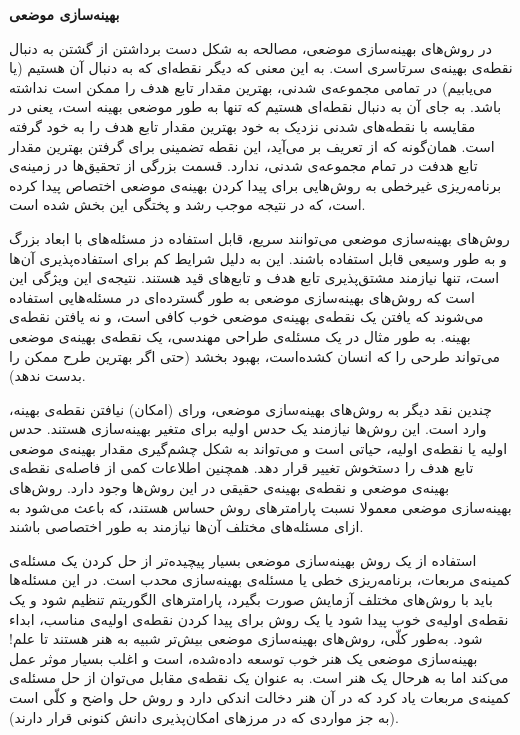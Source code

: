 \textbf{
بهینه‌سازی موضعی
}

در روش‌های بهینه‌سازی موضعی، مصالحه به شکل دست برداشتن از گشتن به دنبال نقطه‌ی بهینه‌ی سرتاسری است. به این معنی که دیگر نقطه‌ای که به دنبال آن هستیم (یا می‌یابیم) در تمامی مجموعه‌ی شدنی، بهترین مقدار تابع هدف را ممکن است نداشته باشد. به جای آن به دنبال نقطه‌ای هستیم که تنها به طور موضعی بهینه است، یعنی در مقایسه با نقطه‌های شدنی نزدیک به خود بهترین مقدار تابع هدف را به خود گرفته است. همان‌گونه که از تعریف بر می‌آید، این نقطه تضمینی برای گرفتن بهترین مقدار تابع هدفت در تمام مجموعه‌ی شدنی، ندارد. قسمت بزرگی از تحقیق‌ها در زمینه‌ی برنامه‌ریزی غیرخطی به روش‌هایی برای پیدا کردن بهینه‌ی موضعی اختصاص پیدا کرده است، که در نتیجه موجب رشد و پختگی این بخش شده است.


روش‌های بهینه‌سازی موضعی می‌توانند سریع، قابل استفاده دز مسئله‌های با ابعاد بزرگ و به طور وسیعی قابل استفاده باشند. این به دلیل شرایط کم برای استفاده‌پذیری آن‌ها است، تنها نیازمند مشتق‌پذیری تابع هدف و تابع‌های قید هستند. نتیجه‌ی این ویژگی این است که روش‌های بهینه‌سازی موضعی به طور گسترده‌ای در مسئله‌هایی استفاده می‌شوند که یافتن یک نقطه‌ی بهینه‌ی موضعی خوب کافی است، و نه یافتن نقطه‌ی بهینه. به طور مثال در یک مسئله‌ی طراحی مهندسی، یک نقطه‌ی بهینه‌ی موضعی می‌تواند طرحی را که انسان کشده‌است، بهبود بخشد (حتی اگر بهترین طرح ممکن را بدست ندهد).


چندین نقد دیگر به روش‌های بهینه‌سازی موضعی، ورای (امکان) نیافتن نقطه‌ی بهینه، وارد است. این روش‌ها نیازمند یک حدس اولیه
برای متغیر بهینه‌سازی هستند. حدس اولیه یا نقطه‌ی اولیه، حیاتی است و می‌تواند به شکل چشم‌گیری مقدار بهینه‌ی موضعی تابع هدف را دستخوش تغییر قرار دهد. همچنین اطلاعات کمی از فاصله‌ی نقطه‌ی بهینه‌ی موضعی و نقطه‌ی بهینه‌ی حقیقی در این روش‌ها وجود دارد. روش‌های بهینه‌سازی موضعی معمولا نسبت پارامترهای روش حساس هستند، که باعث می‌شود به ازای مسئله‌های مختلف آن‌ها نیازمند به طور اختصاصی باشند.


استفاده از یک روش بهینه‌سازی موضعی بسیار پیچیده‌تر از حل کردن یک مسئله‌ی کمینه‌ی مربعات، برنامه‌ریزی خطی یا مسئله‌ی بهینه‌سازی محدب است. در این مسئله‌ها باید با روش‌های مختلف آزمایش صورت بگیرد، پارامترهای الگوریتم تنظیم شود و یک نقطه‌ی اولیه‌ی خوب پیدا شود یا یک روش برای پیدا کردن نقطه‌ی اولیه‌ی مناسب، ابداء شود. به‌طور کلّی، روش‌های بهینه‌سازی موضعی بیش‌تر شبیه به هنر هستند تا علم! بهینه‌سازی موضعی یک هنر خوب توسعه داده‌شده، است و اغلب بسیار موثر عمل می‌کند اما به هرحال یک هنر است. به عنوان یک نقطه‌ی مقابل می‌توان از حل مسئله‌ی کمینه‌ی مربعات یاد کرد که در آن هنر دخالت اندکی دارد و روش حل واضح و کلّی است (به جز مواردی که در مرزهای امکان‌پذیری دانش کنونی قرار دارند).

